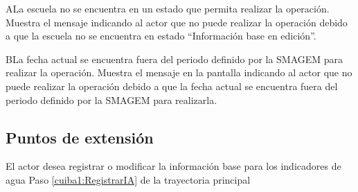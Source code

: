   \begin{UCtrayectoriaA}{A}{La escuela no se encuentra en un estado que permita realizar la operación.}
    \UCpaso[\UCsist] Muestra el mensaje  indicando al actor que no puede realizar la operación debido a que la escuela no se encuentra en estado ``Información base en edición''. 
 \end{UCtrayectoriaA}

   \begin{UCtrayectoriaA}{B}{La fecha actual se encuentra fuera del periodo definido por la SMAGEM para realizar la operación.}
    \UCpaso[\UCsist] Muestra el mensaje  en la pantalla  indicando al actor que no puede realizar la operación debido a que la fecha actual se encuentra fuera del periodo definido por la SMAGEM para realizarla. 
 \end{UCtrayectoriaA}
 
\subsection{Puntos de extensión}

\UCExtensionPoint
{El actor desea registrar o modificar la información base para los indicadores de agua}
{ Paso \ref{cuiba1:RegistrarIA} de la trayectoria principal}
{}
